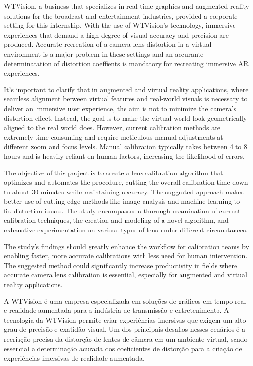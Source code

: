



\noindent WTVision, a business that specializes in real-time graphics and augmented reality solutions for the broadcast and entertainment industries, provided a corporate setting for this internship. With the use of WTVision's technology, immersive experiences that demand a high degree of visual accuracy and precision are produced. Accurate recreation of a camera lens distortion in a virtual environment is a major problem in these settings and an accurante determinatation of distortion coeffients is mandatory for recreating immersive AR experiences.

\noindent It's important to clarify that in augmented and virtual reality applications, where seamless alignment between virtual features and real-world visuals is necessary to deliver an immersive user experience, the aim is not to minimize the camera's distortion effect. Instead, the goal is to make the virtual world look geometrically aligned to the real world does. However, current calibration methods are extremely time-consuming and require meticulous manual adjustments at different zoom and focus levels. Manual calibration typically takes between 4 to 8 hours and is heavily reliant on human factors, increasing the likelihood of errors.

\noindent The objective of this project is to create a lens calibration algorithm that optimizes and automates the procedure, cutting the overall calibration time down to about 30 minutes while maintaining accuracy. The suggested approach makes better use of cutting-edge methods like image analysis and machine learning to fix distortion issues. The study encompasses a thorough examination of current calibration techniques, the creation and modeling of a novel algorithm, and exhaustive experimentation on various types of lens under different circunstances.

\noindent The study's findings should greatly enhance the workflow for calibration teams by enabling faster, more accurate calibrations with less need for human intervention. The suggested method could significantly increase productivity in fields where accurate camera lens calibration is essential, especially for augmented and virtual reality applications.

\noindent A WTVision é uma empresa especializada em soluções de gráficos em tempo real e realidade aumentada para a indústria de transmissão e entretenimento. A tecnologia da WTVision permite criar experiências imersivas que exigem um alto grau de precisão e exatidão visual. Um dos principais desafios nesses cenários é a recriação precisa da distorção de lentes de câmera em um ambiente virtual, sendo essencial a determinação acurada dos coeficientes de distorção para a criação de experiências imersivas de realidade aumentada.


